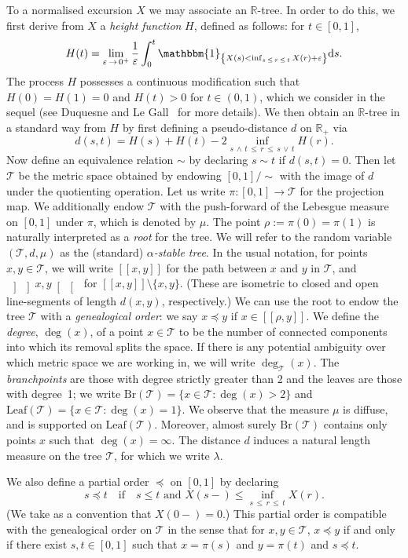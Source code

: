 \documentclass[10pt]{amsart}
\theoremstyle{definition}\newtheorem{defi}[theo]{Definition}\newtheorem{rema}[theo]{Remark}\newtheorem{exam}[theo]{Example}\newtheorem{exem}[theo]{Example}\newtheorem{nota}[theo]{Notation}
\newcommand{\I}[1]{\ensuremath{\mathbbm{1}_{ \left\{ #1 \right\} }}}
\newcommand{\seg}[2]{\left[\! \left[#1, #2 \right] \! \right]}
\newcommand{\oseg}[2]{\, \left] \! \left] #1, #2 \right[\! \right[\,}
\newcommand{\Br}{\mathrm{Br}}
\newcommand{\rmd}{\mathrm{d}}
\newcommand{\Leaf}{\mathrm{Leaf}}
\newcommand{\cT}{\mathcal{T}}
\newcommand{\R}{\mathbb{R}}
\begin{document}
To a normalised excursion $X$ we may associate an $\R$-tree. In order to do this, we first derive from $X$ a \emph{height function} $H$, defined as follows: for $t \in [0,1]$,
\[
H(t) = \lim_{\varepsilon\,\to\,0^+} \frac{1}{\varepsilon} \int_0^t \I{X(s) < \inf_{s\,\le\,r\,\le \,t}X(r) + \varepsilon} \rmd s.
\]
The process $H$ possesses a continuous modification such that $H(0) = H(1) = 0$ and $H(t) > 0$ for $t \in (0,1)$, which we consider in the sequel (see Duquesne and Le Gall~\cite{DuquesneLeGall} for more details). We then obtain an $\R$-tree in a standard way from $H$ by first defining a pseudo-distance $d$ on $\R_+$ via
\[
d(s,t) = H(s) + H(t) - 2 \inf_{s\,\wedge\,t\,\le\,r \,\le\,s\,\vee\,t} H(r).
\]
Now define an equivalence relation $\sim$ by declaring $s \sim t$ if $d(s,t) = 0$. Then let $\cT$ be the metric space obtained by endowing $[0,1]/\sim$ with the image of $d$ under the quotienting operation. Let us write $\pi: [0,1] \to \cT$ for the projection map. We additionally endow $\cT$ with the push-forward of the Lebesgue measure on $[0,1]$ under $\pi$, which is denoted by $\mu$. The point $\rho := \pi(0) = \pi(1)$ is naturally interpreted as a \emph{root} for the tree. We will refer to the random variable $(\cT,d,\mu)$ as the (standard) \emph{$\alpha$-stable tree}. In the usual notation, for points $x,y \in \cT$, we will write $\seg{x}{y}$ for the path between $x$ and $y$ in $\cT$, and $\oseg{x}{y}$ for $\seg{x}{y} \setminus \{x,y\}$. (These are isometric to closed and open line-segments of length $d(x,y)$, respectively.) We can use the root to endow the tree $\cT$ with a \emph{genealogical order}: we say $x \preceq y$ if $x \in \seg{\rho}{y}$. We define the \emph{degree}, $\deg(x)$, of a point $x \in \cT$ to be the number of connected components into which its removal splits the space. If there is any potential ambiguity over which metric space we are working in, we will write $\deg_{\cT}(x)$. The \emph{branchpoints} are those with degree strictly greater than 2 and the leaves are those with degree~1; we write $\Br(\cT) = \{x \in \cT: \deg(x) > 2\}$ and $\Leaf(\cT) = \{x \in \cT: \deg(x) = 1\}$. We observe that the measure $\mu$ is diffuse, and is supported on $\Leaf(\cT)$. Moreover, almost surely $\Br(\cT)$ contains only points $x$ such that $\deg(x) = \infty$. The distance $d$ induces a natural length measure on the tree $\cT$, for which we write $\lambda$.


We also define a partial order $\preceq$ on $[0,1]$ by declaring
\begin{equation}\label{def:partial order on 0,1}
s \preceq t \quad \text{if} \quad s \le t \text{ and } X(s-) \leq \inf_{s\,\le\,r\,\le\,t} X(r).
\end{equation}
(We take as a convention that $X(0-) = 0$.) This partial order is compatible with the genealogical order on $\cT$ in the sense that for $x,y \in \cT$, $x \preceq y$ if and only if there exist $s,t \in [0,1]$ such that $x = \pi(s)$ and $y = \pi(t)$ and $s \preceq t$.
\end{document}
